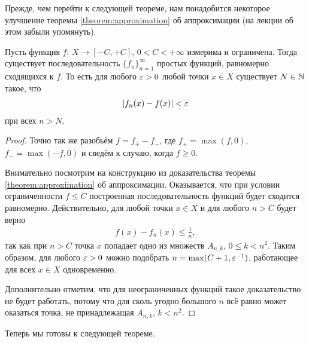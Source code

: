 Прежде, чем перейти к следующей теореме, нам понадобится некоторое улучшение теоремы \ref{theorem:approximation} об аппроксимации (на лекции об этом забыли упомянуть).

\begin{thm}
\label{theorem:uniform_approximation}

Пусть функция $f \colon\, X \to [-C, +C] $, $0 < C < +\infty$  измерима и ограничена. Тогда существует последовательность $\{f_{n}\}_{n=1}^{\infty} $ простых функций, равномерно сходящихся к $f$. То есть для любого $\varepsilon > 0$ любой точки $x \in X$ существует $N \in \mathbb{N}$ такое, что \begin{align*}
 \left| f_n(x) - f(x) \right| < \varepsilon
\end{align*} при всех $n > N$.
\end{thm}
\begin{proof}
 Точно так же разобьём $f = f_+ - f_-$, где $f_+ = \max(f,0)$, $f_- = \max(-f, 0)$ и сведём к случаю, когда $f \geqslant 0$.

 Внимательно посмотрим на конструкцию из доказательства теоремы \ref{theorem:approximation} об аппроксимации. Оказывается, что при условии ограниченности $f \leqslant C$ построенная последовательность функций будет сходится равномерно. Действительно, для любой точки $x \in X$ и для любого $n > C$ будет верно \begin{align*}
  f(x) - f_n(x) \leqslant \frac{1}{n}
 ,\end{align*} так как при $n > C$ точка $x$ попадает одно из множеств $A_{n,k}$, $0 \leqslant k < n^{2}$. Таким образом, для любого $\varepsilon > 0$ можно подобрать $n = \max(C + 1, \varepsilon^{-1})$, работающее для всех $x \in X$ одновременно.

 Дополнительно отметим, что для неограниченных функций такое доказательство не будет работать, потому что для сколь угодно большого $n$ всё равно может оказаться точка, не принадлежащая $A_{n,k}$, $k < n^{2}$.
\end{proof}

Теперь мы готовы к следующей теореме.

